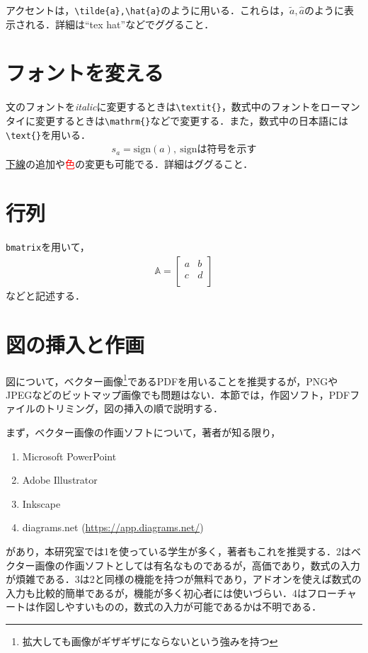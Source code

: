 \documentclass[11pt,a4paper]{jsarticle}
\begin{document}
アクセントは，\verb|\tilde{a},\hat{a}|のように用いる．これらは，$\tilde{a},\hat{a}$のように表示される．詳細は``tex hat''などでググること．

\section{フォントを変える}

文のフォントを\textit{italic}に変更するときは\verb|\textit{}|，数式中のフォントをローマンタイに変更するときは\verb|\mathrm{}|などで変更する．また，数式中の日本語には\verb|\text{}|を用いる．
\begin{align*}
  s_a = \mathrm{sign}(a),~\text{signは符号を示す}
\end{align*}
\underline{下線}の追加や\textcolor{red}{色}の変更も可能でる．詳細はググること．

\section{行列}

\verb|bmatrix|を用いて，
\begin{align*}
  \mathbb{A}=
  \begin{bmatrix}
    a & b \\
    c & d \\
  \end{bmatrix}
\end{align*}
などと記述する．

\section{図の挿入と作画}

図について，ベクター画像\footnote{拡大しても画像がギザギザにならないという強みを持つ}であるPDFを用いることを推奨するが，PNGやJPEGなどのビットマップ画像でも問題はない．本節では，作図ソフト，PDFファイルのトリミング，図の挿入の順で説明する．

まず，ベクター画像の作画ソフトについて，著者が知る限り，
\begin{enumerate} %
  \item Microsoft PowerPoint
  \item Adobe Illustrator
  \item Inkscape
  \item diagrams.net (\url{https://app.diagrams.net/})
\end{enumerate}
があり，本研究室では1を使っている学生が多く，著者もこれを推奨する．2はベクター画像の作画ソフトとしては有名なものであるが，高価であり，数式の入力が煩雑である．3は2と同様の機能を持つが無料であり，アドオンを使えば数式の入力も比較的簡単であるが，機能が多く初心者には使いづらい．4はフローチャートは作図しやすいものの，数式の入力が可能であるかは不明である．
\end{document}
